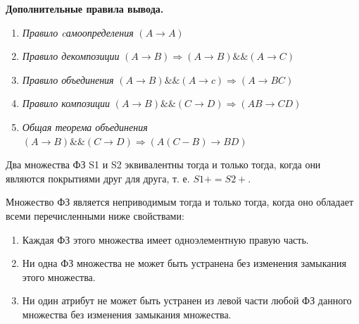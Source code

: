 \textbf{Дополнительные правила вывода.}
\begin{enumerate}
	\item \textit{Правило cамоопределения} $(A \to A)$
	\item \textit{Правило декомпозиции} $(A \to B) \Rightarrow (A \to B) \&\& (A \to C)$
	\item \textit{Правило объединения} $(A \to B) \&\& (A \to c) \Rightarrow (A \to BC)$
	\item \textit{Правило композиции} $(A \to B) \&\& (C \to D) \Rightarrow (AB \to CD)$
	\item \textit{Общая теорема объединения} $(A \to B) \&\& (C \to D) \Rightarrow (A(C - B) \to BD)$
\end{enumerate}

Два множества ФЗ S1 и S2 эквивалентны тогда и только тогда, когда они являются покрытиями друг для друга, т. е. $S1+ = S2+$.

Множество ФЗ является неприводимым тогда и только тогда, когда оно обладает всеми перечисленными ниже свойствами:
\begin{enumerate}
	\item Каждая ФЗ этого множества имеет одноэлементную правую часть.
	\item Ни одна ФЗ множества не может быть устранена без изменения замыкания этого множества.
	\item Ни один атрибут не может быть устранен из левой части любой ФЗ данного множества без изменения замыкания множества.
\end{enumerate}

\clearpage

